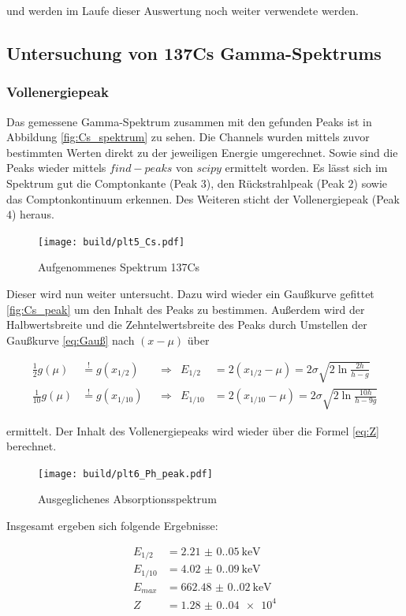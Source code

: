 und werden im Laufe dieser Auswertung noch weiter verwendete werden.

\subsection{Untersuchung von 137Cs Gamma-Spektrums}
\subsubsection{Vollenergiepeak}
Das gemessene Gamma-Spektrum zusammen mit den gefunden Peaks ist in Abbildung
\eqref{fig:Cs_spektrum} zu sehen. Die Channels wurden mittels zuvor bestimmten
Werten direkt zu der jeweiligen Energie umgerechnet. Sowie sind die Peaks
wieder mittels $find-peaks$ von $scipy$ \cite{scipy} ermittelt worden. Es lässt
sich im Spektrum gut die Comptonkante (Peak $3$), den Rückstrahlpeak (Peak $2$)
sowie das Comptonkontinuum erkennen. Des Weiteren sticht der Vollenergiepeak
(Peak $4$) heraus.

\begin{figure}[H]
	\centering
	\texttt{[image: build/plt5\_Cs.pdf]}
	\caption{Aufgenommenes Spektrum 137Cs}
	\label{fig:Cs_spektrum}
\end{figure}

Dieser wird nun weiter untersucht. Dazu wird wieder ein Gaußkurve gefittet
\eqref{fig:Cs_peak} um den Inhalt des Peaks zu bestimmen. Außerdem wird der
Halbwertsbreite und die Zehntelwertsbreite des Peaks durch Umstellen der
Gaußkurve \eqref{eq:Gauß} nach $(x-\mu)$ über

\begin{align*}
	\frac{1}{2}g(\mu)  & \stackrel{!}{=}g(x_{1/2})  &  & \Rightarrow & E_{1/2}  & =2(x_{1/2}-\mu)=2\sigma \sqrt{2 \ln{\frac{2h}{h-g}}}    \\
	\frac{1}{10}g(\mu) & \stackrel{!}{=}g(x_{1/10}) &  & \Rightarrow & E_{1/10} & =2(x_{1/10}-\mu)=2\sigma \sqrt{2 \ln{\frac{10h}{h-9g}}}
\end{align*}

ermittelt. Der Inhalt des Vollenergiepeaks wird wieder über die Formel
\eqref{eq:Z} berechnet.

\begin{figure}[H]
	\centering
	\texttt{[image: build/plt6\_Ph\_peak.pdf]}
	\caption{Ausgeglichenes Absorptionsspektrum}
	\label{fig:Cs_peak}
\end{figure}

Insgesamt ergeben sich folgende Ergebnisse:

\begin{align*}
	E_{1/2}  & =\qty{2.21(0.05)}{\kilo\eV}   \\
	E_{1/10} & =\qty{4.02(0.09)}{\kilo\eV}   \\
	E_{max}  & =\qty{662.48(0.02)}{\kilo\eV} \\
	Z        & =\num{1.28(0.04)e4}           \\
\end{align*}

